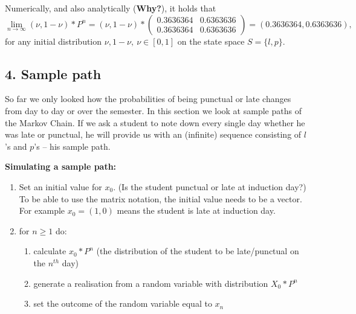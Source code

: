 \documentclass[]{article}
\providecommand{\tightlist}{%
  \setlength{\itemsep}{0pt}\setlength{\parskip}{0pt}}
\begin{document}
Numerically, and also analytically (\textbf{Why?}), it holds that
\begin{equation}
\lim_{n \to \infty} (\nu, 1 - \nu) * P^n = 
(\nu, 1 - \nu) * 
\begin{pmatrix}
  0.3636364 & 0.6363636\\
  0.3636364 & 0.6363636
\end{pmatrix}
 = (0.3636364, 0.6363636),
\end{equation} for any initial distribution
\(\nu, 1-\nu, ~ \nu \in [0,1]\) on the state space \(S = \{l, p\}\).

\hypertarget{sample-path}{%
\subsection{4. Sample path}\label{sample-path}}

So far we only looked how the probabilities of being punctual or late
changes from day to day or over the semester. In this section we look at
sample paths of the Markov Chain. If we ask a student to note down every
single day whether he was late or punctual, he will provide us with an
(infinite) sequence consisting of \(l\)'s and \(p\)'s -- his sample
path.

\textbf{Simulating a sample path:}

\begin{enumerate}
\def\labelenumi{\arabic{enumi}.}
\tightlist
\item
  Set an initial value for \(x_0\). (Is the student punctual or late at
  induction day?) To be able to use the matrix notation, the initial
  value needs to be a vector. For example \(x_0 = (1,0)\) means the
  student is late at induction day.\\
\item
  for \(n \geq 1\) do:

  \begin{enumerate}
  \def\labelenumii{\alph{enumii})}
  \tightlist
  \item
    calculate \(x_{0} * P^n\) (the distribution of the student to be
    late/punctual on the \(n^{th}\) day)\\
  \item
    generate a realisation from a random variable with distribution
    \(X_{0} * P^n\)\\
  \item
    set the outcome of the random variable equal to \(x_n\)
  \end{enumerate}
\end{enumerate}
\end{document}
